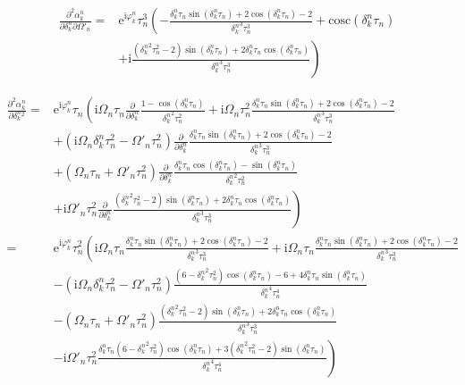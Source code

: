 \documentclass[10pt,fleqn]{article}
\newcommand{\ue}{\mathrm{e}}
\newcommand{\ui}{\mathrm{i}}
\newcommand{\eqar}[1]
{
  \begin{align*}
    #1
  \end{align*}
}
\newcommand{\paren}[1]{{\left({#1}\right)}}
\newcommand{\lparen}[1]{{\left({#1}\right.}}
\newcommand{\rparen}[1]{{\left.{#1}\right)}}
\newcommand{\pdiff}[3][{}]{{\frac{\partial^{#1} {#2}}{\partial {#3}{}^{#1}}}}
\begin{document}
\eqar{
  \frac{\partial^2\alpha_k^n}{\partial\delta_k^n\partial\Omega'_n}=&\ue^{\ui\varphi_k^n}\tau_n^3\lparen{
    -\frac{\delta_k^n\tau_n\sin\paren{\delta_k^n\tau_n}+2\cos\paren{\delta_k^n\tau_n}-2}{{\delta_k^n}^3\tau_n^3}
    +\mathrm{cosc}\paren{\delta_k^n\tau_n}
  }\\
  &\rparen{
    +\ui\frac{\paren{{\delta_k^n}^2\tau_n^2-2}\sin\paren{\delta_k^n\tau_n}+2\delta_k^n\tau_n\cos\paren{\delta_k^n\tau_n}}{{\delta_k^n}^3\tau_n^3}
  }
}
\eqar{
  \pdiff[2]{\alpha_k^n}{\delta_k^n}=&\ue^{\ui\varphi_k^n}\tau_n\lparen{
    \ui\Omega_n\tau_n\pdiff{}{\delta_k^n}\frac{1-\cos\paren{\delta_k^n\tau_n}}{{\delta_k^n}^2\tau_n^2}
    +\ui\Omega_n\tau_n^2
    \frac{\delta_k^n\tau_n\sin\paren{\delta_k^n\tau_n}+2\cos\paren{\delta_k^n\tau_n}-2}{{\delta_k^n}^3\tau_n^3}
  }\\
  &+\paren{\ui\Omega_n\delta_k^n\tau_n^2-\Omega'_n\tau_n^2}
  \pdiff{}{\delta_k^n}\frac{\delta_k^n\tau_n\sin\paren{\delta_k^n\tau_n}+2\cos\paren{\delta_k^n\tau_n}-2}{{\delta_k^n}^3\tau_n^3}
  \\
  &+\paren{\Omega_n\tau_n+\Omega'_n\tau_n^2}
  \pdiff{}{\delta_k^n}\frac{\delta_k^n\tau_n\cos\paren{\delta_k^n\tau_n}-\sin\paren{\delta_k^n\tau_n}}{{\delta_k^n}^2\tau_n^2}\\
  &\rparen{
    +\ui\Omega'_n\tau_n^2
    \pdiff{}{\delta_k^n}\frac{\paren{{\delta_k^n}^2\tau_n^2-2}\sin\paren{\delta_k^n\tau_n}+2\delta_k^n\tau_n\cos\paren{\delta_k^n\tau_n}}{{\delta_k^n}^3\tau_n^3}
  }\\
  =&\ue^{\ui\varphi_k^n}\tau_n^2\lparen{
    \ui\Omega_n\tau_n
    \frac{\delta_k^n\tau_n\sin\paren{\delta_k^n\tau_n}+2\cos\paren{\delta_k^n\tau_n}-2}{{\delta_k^n}^3\tau_n^3}
    +\ui\Omega_n\tau_n
    \frac{\delta_k^n\tau_n\sin\paren{\delta_k^n\tau_n}+2\cos\paren{\delta_k^n\tau_n}-2}{{\delta_k^n}^3\tau_n^3}
  }\\
  &-\paren{\ui\Omega_n\delta_k^n\tau_n^2-\Omega'_n\tau_n^2}
  \frac{
    \paren{6-{\delta_k^n}^2\tau_n^2}\cos\paren{{\delta_k^n}\tau_n}
    -6+4{\delta_k^n}\tau_n\sin\paren{{\delta_k^n}\tau_n}
  }{{\delta_k^n}^4\tau_n^4}
  \\
  &-\paren{\Omega_n\tau_n+\Omega'_n\tau_n^2}
  \frac{\paren{{\delta_k^n}^2\tau_n^2-2}\sin\paren{\delta_k^n\tau_n}+2\delta_k^n\tau_n\cos\paren{\delta_k^n\tau_n}}{{\delta_k^n}^3\tau_n^3}\\
  &\rparen{
    -\ui\Omega'_n\tau_n^2
    \frac{
      {\delta_k^n}\tau_n\paren{6-{\delta_k^n}^2\tau_n^2}\cos\paren{{\delta_k^n}\tau_n}
      +3\paren{{\delta_k^n}^2\tau_n^2-2}\sin\paren{{\delta_k^n}\tau_n}
    }{{\delta_k^n}^4\tau_n^4}
}}
\end{document}
